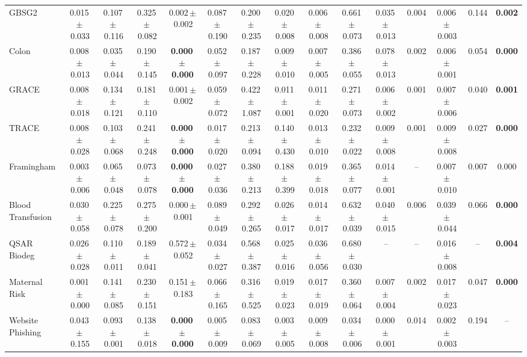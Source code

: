 \documentclass[8pt]{extarticle}
\begin{document}
\begin{longtable}{l*{14}{c}}
GBSG2 & 0.015\,$\pm$\,0.033 & 0.107\,$\pm$\,0.116 & 0.325\,$\pm$\,0.082 & 0.002\,$\pm$\,0.002 & 0.087\,$\pm$\,0.190 & 0.200\,$\pm$\,0.235 & 0.020\,$\pm$\,0.008 & 0.006\,$\pm$\,0.008 & 0.661\,$\pm$\,0.073 & 0.035\,$\pm$\,0.013 & 0.004 & 0.006\,$\pm$\,0.003 & 0.144 & \textbf{0.002} \\
Colon & 0.008\,$\pm$\,0.013 & 0.035\,$\pm$\,0.044 & 0.190\,$\pm$\,0.145 & \textbf{0.000\,$\pm$\,0.000} & 0.052\,$\pm$\,0.097 & 0.187\,$\pm$\,0.228 & 0.009\,$\pm$\,0.010 & 0.007\,$\pm$\,0.005 & 0.386\,$\pm$\,0.055 & 0.078\,$\pm$\,0.013 & 0.002 & 0.006\,$\pm$\,0.001 & 0.054 & \textbf{0.000} \\
GRACE & 0.008\,$\pm$\,0.018 & 0.134\,$\pm$\,0.121 & 0.181\,$\pm$\,0.110 & 0.001\,$\pm$\,0.002 & 0.059\,$\pm$\,0.072 & 0.422\,$\pm$\,1.087 & 0.011\,$\pm$\,0.001 & 0.011\,$\pm$\,0.020 & 0.271\,$\pm$\,0.073 & 0.006\,$\pm$\,0.002 & 0.001 & 0.007\,$\pm$\,0.006 & 0.040 & \textbf{0.001} \\
TRACE & 0.008\,$\pm$\,0.028 & 0.103\,$\pm$\,0.068 & 0.241\,$\pm$\,0.248 & \textbf{0.000\,$\pm$\,0.000} & 0.017\,$\pm$\,0.020 & 0.213\,$\pm$\,0.094 & 0.140\,$\pm$\,0.430 & 0.013\,$\pm$\,0.010 & 0.232\,$\pm$\,0.022 & 0.009\,$\pm$\,0.008 & 0.001 & 0.009\,$\pm$\,0.008 & 0.027 & \textbf{0.000} \\
Framingham & 0.003\,$\pm$\,0.006 & 0.065\,$\pm$\,0.048 & 0.073\,$\pm$\,0.078 & \textbf{0.000\,$\pm$\,0.000} & 0.027\,$\pm$\,0.036 & 0.380\,$\pm$\,0.213 & 0.188\,$\pm$\,0.399 & 0.019\,$\pm$\,0.018 & 0.365\,$\pm$\,0.077 & 0.014\,$\pm$\,0.001 & -- & 0.007\,$\pm$\,0.010 & 0.007 & 0.000 \\
Blood Transfusion & 0.030\,$\pm$\,0.058 & 0.225\,$\pm$\,0.078 & 0.275\,$\pm$\,0.200 & 0.000\,$\pm$\,0.001 & 0.089\,$\pm$\,0.049 & 0.292\,$\pm$\,0.265 & 0.026\,$\pm$\,0.017 & 0.014\,$\pm$\,0.017 & 0.632\,$\pm$\,0.039 & 0.040\,$\pm$\,0.015 & 0.006 & 0.039\,$\pm$\,0.044 & 0.066 & \textbf{0.000} \\
QSAR Biodeg & 0.026\,$\pm$\,0.028 & 0.110\,$\pm$\,0.011 & 0.189\,$\pm$\,0.041 & 0.572\,$\pm$\,0.052 & 0.034\,$\pm$\,0.027 & 0.568\,$\pm$\,0.387 & 0.025\,$\pm$\,0.016 & 0.036\,$\pm$\,0.056 & 0.680\,$\pm$\,0.030 & -- & -- & 0.016\,$\pm$\,0.008 & -- & \textbf{0.004} \\
Maternal Risk & 0.001\,$\pm$\,0.000 & 0.141\,$\pm$\,0.085 & 0.230\,$\pm$\,0.151 & 0.151\,$\pm$\,0.183 & 0.066\,$\pm$\,0.165 & 0.316\,$\pm$\,0.525 & 0.019\,$\pm$\,0.023 & 0.017\,$\pm$\,0.019 & 0.360\,$\pm$\,0.064 & 0.007\,$\pm$\,0.004 & 0.002 & 0.017\,$\pm$\,0.023 & 0.047 & \textbf{0.000} \\
Website Phishing & 0.043\,$\pm$\,0.155 & 0.093\,$\pm$\,0.001 & 0.138\,$\pm$\,0.018 & \textbf{0.000\,$\pm$\,0.000} & 0.005\,$\pm$\,0.009 & 0.083\,$\pm$\,0.069 & 0.003\,$\pm$\,0.005 & 0.009\,$\pm$\,0.008 & 0.034\,$\pm$\,0.006 & 0.000\,$\pm$\,0.001 & 0.014 & 0.002\,$\pm$\,0.003 & 0.194 & -- \\
\end{longtable}
\end{document}
